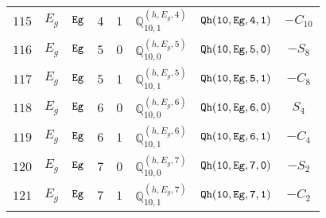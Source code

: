 \documentclass[fleqn,8pt]{jsarticle}
\begin{document}
\begin{table}[ht!]
\begin{center}
\begin{tabular}{cccccccc}
$ 115 $ & $ E_{g} $ & $ {\tt Eg} $ & $ 4 $ & $ 1 $ & $ \mathbb{Q}_{10,1}^{(h,E_{g},4)} $ & $ {\tt Qh(10,Eg,4,1)} $ & $ - C_{10} $ \\
$ 116 $ & $ E_{g} $ & $ {\tt Eg} $ & $ 5 $ & $ 0 $ & $ \mathbb{Q}_{10,0}^{(h,E_{g},5)} $ & $ {\tt Qh(10,Eg,5,0)} $ & $ - S_{8} $ \\
$ 117 $ & $ E_{g} $ & $ {\tt Eg} $ & $ 5 $ & $ 1 $ & $ \mathbb{Q}_{10,1}^{(h,E_{g},5)} $ & $ {\tt Qh(10,Eg,5,1)} $ & $ - C_{8} $ \\
$ 118 $ & $ E_{g} $ & $ {\tt Eg} $ & $ 6 $ & $ 0 $ & $ \mathbb{Q}_{10,0}^{(h,E_{g},6)} $ & $ {\tt Qh(10,Eg,6,0)} $ & $ S_{4} $ \\
$ 119 $ & $ E_{g} $ & $ {\tt Eg} $ & $ 6 $ & $ 1 $ & $ \mathbb{Q}_{10,1}^{(h,E_{g},6)} $ & $ {\tt Qh(10,Eg,6,1)} $ & $ - C_{4} $ \\
$ 120 $ & $ E_{g} $ & $ {\tt Eg} $ & $ 7 $ & $ 0 $ & $ \mathbb{Q}_{10,0}^{(h,E_{g},7)} $ & $ {\tt Qh(10,Eg,7,0)} $ & $ - S_{2} $ \\
$ 121 $ & $ E_{g} $ & $ {\tt Eg} $ & $ 7 $ & $ 1 $ & $ \mathbb{Q}_{10,1}^{(h,E_{g},7)} $ & $ {\tt Qh(10,Eg,7,1)} $ & $ - C_{2} $ \\
 \hline \hline
\end{tabular}
\end{center}
\end{table}
\end{document}
